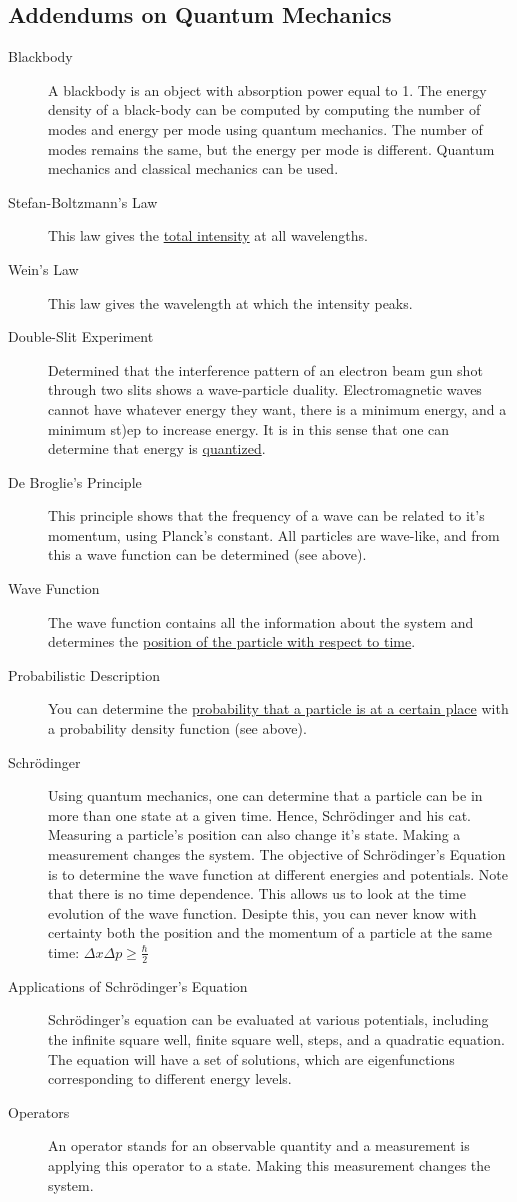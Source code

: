 \documentclass{article}
\begin{document}
\subsection*{Addendums on Quantum Mechanics}
\begin{description}
    \item [Blackbody] A blackbody is an object with absorption power equal to 1. The energy density of a black-body can be computed by computing the number of modes and energy per mode using quantum mechanics. The number of modes remains the same, but the energy per mode is different. Quantum mechanics and classical mechanics can be used.
    \item [Stefan-Boltzmann's Law] This law gives the \underline{total intensity} at all wavelengths.
    \item [Wein's Law] This law gives the wavelength at which the intensity peaks.
    \item [Double-Slit Experiment] Determined that the interference pattern of an electron beam gun shot through two slits shows a wave-particle duality. Electromagnetic waves cannot have whatever energy they want, there is a minimum energy, and a minimum st)ep to increase energy. It is in this sense that one can determine that energy is \underline{quantized}.
    \item [De Broglie's Principle] This principle shows that the frequency of a wave can be related to it's momentum, using Planck's constant. All particles are wave-like, and from this a wave function can be determined (see above).
    \item [Wave Function] The wave function contains all the information about the system and determines the \ul{position of the particle with respect to time}.
    \item [Probabilistic Description] You can determine the \ul{probability that a particle is at a certain place} with a probability density function (see above).
    \item [Schrödinger] Using quantum mechanics, one can determine that a particle can be in more than one state at a given time. Hence, Schrödinger and his cat. Measuring a particle's position can also change it's state. Making a measurement changes the system. The objective of Schrödinger's Equation is to determine the wave function at different energies and potentials. Note that there is no time dependence. This allows us to look at the time evolution of the wave function. Desipte this, you can never know with certainty both the position and the momentum of a particle at the same time: \(\Delta x\Delta p\geq\frac{\hbar}{2}\)
    \item[Applications of Schrödinger's Equation] Schrödinger's equation can be evaluated at various potentials, including the infinite square well, finite square well, steps, and a quadratic equation. The equation will have a set of solutions, which are eigenfunctions corresponding to different energy levels.
    \item [Operators] An operator stands for an observable quantity and a measurement is applying this operator to a state. Making this measurement changes the system.

\end{description}
\end{document}
